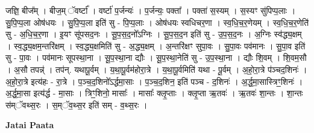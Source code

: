 \documentclass[17pt]{extarticle}
\begin{document}
जज्ञि॒ बीज᳚म् । बीज॒म् ॅवर्ष्टा᳚ । वर्ष्टा॑ प॒र्जन्यः॑ । प॒र्जन्यः॒ पक्ता᳚ । पक्ता॑ स॒स्यम् । स॒स्यꣳ सु॑पिप्प॒लाः । सु॒पि॒प्प॒ला ओष॑धयः । सु॒पि॒प्प॒ला इति॑ सु - पि॒प्प॒लाः । ओष॑धयः स्वधिचर॒णा । स्व॒धि॒च॒र॒णेयम् । स्व॒धि॒च॒र॒णेति॑ सु - अ॒धि॒च॒र॒णा । इ॒यꣳ सू॑पसद॒नः । सू॒प॒स॒द॒नो᳚ऽग्निः । सू॒प॒स॒द॒न इति॑ सु - उ॒प॒स॒द॒नः । अ॒ग्निः स्व॑द्ध्य॒क्षम् । स्व॒द्ध्य॒क्षम॒न्तरि॑क्षम् । स्व॒द्ध्य॒क्षमिति॑ सु - अ॒द्ध्य॒क्षम् । अ॒न्तरि॑क्षꣳ सुपा॒वः । सु॒पा॒वः पव॑मानः । सु॒पा॒व इति॑ सु - पा॒वः । पव॑मानः सूपस्था॒ना । सू॒प॒स्था॒ना द्यौः । सू॒प॒स्था॒नेति॑ सु - उ॒प॒स्था॒ना । द्यौः शि॒वम् । शि॒वम॒सौ । अ॒सौ तपन्न्॑ । तप॑न्. यथापू॒र्वम् । य॒था॒पू॒र्वम॑होरा॒त्रे । य॒था॒पू॒र्वमिति॑ यथा - पू॒र्वम् । अ॒हो॒रा॒त्रे प॑ञ्चद॒शिनः॑ । अ॒हो॒रा॒त्रे इत्य॑हः - रा॒त्रे । प॒ञ्च॒द॒शिनो᳚ऽर्द्धमा॒साः । प॒ञ्च॒द॒शिन॒ इति॑ पञ्च - द॒शिनः॑ । अ॒र्द्ध॒मा॒सास्त्रिꣳ॒॒शिनः॑ । अ॒र्द्ध॒मा॒सा इत्य॑र्द्ध - मा॒साः । त्रिꣳ॒॒शिनो॒ मासाः᳚ । मासाः᳚ क्लृ॒प्ताः । क्लृ॒प्ता ऋ॒तवः॑ । ऋ॒तवः॑ शा॒न्तः । शा॒न्तः स॑म्ॅवथ्स॒रः । स॒म्ॅव॒थ्स॒र इति॑ सम् - व॒थ्स॒रः । \newline

\textbf{Jatai Paata} \newline
\end{document}
